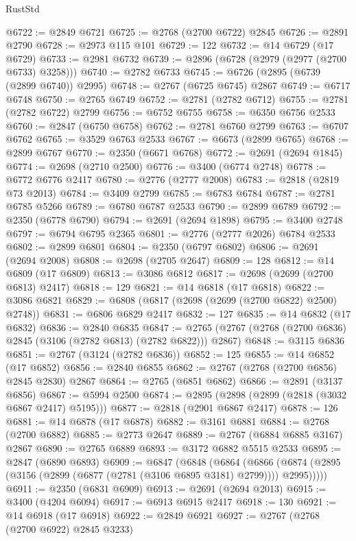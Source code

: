 \begin{lexlean}{RustStd}
\begin{coremodule}
@6722 := @2849 @6721
@6725 := @2768 (@2700 @6722) @2845
@6726 := @2891 @2790
@6728 := @2973 @115 @101
@6729 := 122
@6732 := @14 @6729 (@17 @6729)
@6733 := @2981 @6732
@6739 := @2896 (@6728 (@2979 (@2977 (@2700 @6733) @3258)))
@6740 := @2782 @6733
@6745 := @6726 (@2895 (@6739 (@2899 @6740)) @2995)
@6748 := @2767 (@6725 @6745) @2867
@6749 := @6717 @6748
@6750 := @2765 @6749
@6752 := @2781 (@2782 @6712)
@6755 := @2781 (@2782 @6722) @2799
@6756 := @6752 @6755
@6758 := @6350 @6756 @2533
@6760 := @2847 (@6750 @6758)
@6762 := @2781 @6760 @2799
@6763 := @6707 @6762
@6765 := @3529 @6763 @2533
@6767 := @6673 (@2899 @6765)
@6768 := @2899 @6767
@6770 := @2350 (@6671 @6768)
@6772 := @2691 (@2694 @1845)
@6774 := @2698 (@2710 @2500)
@6776 := @3400 (@6774 @2748)
@6778 := @6772 @6776 @2417
@6780 := @2776 (@2777 @2008)
@6783 := @2818 (@2819 @73 @2013)
@6784 := @3409 @2799
@6785 := @6783 @6784
@6787 := @2781 @6785 @5266
@6789 := @6780 @6787 @2533
@6790 := @2899 @6789
@6792 := @2350 (@6778 @6790)
@6794 := @2691 (@2694 @1898)
@6795 := @3400 @2748
@6797 := @6794 @6795 @2365
@6801 := @2776 (@2777 @2026) @6784 @2533
@6802 := @2899 @6801
@6804 := @2350 (@6797 @6802)
@6806 := @2691 (@2694 @2008)
@6808 := @2698 (@2705 @2647)
@6809 := 128
@6812 := @14 @6809 (@17 @6809)
@6813 := @3086 @6812
@6817 := @2698 (@2699 (@2700 @6813) @2417)
@6818 := 129
@6821 := @14 @6818 (@17 @6818)
@6822 := @3086 @6821
@6829 := @6808 (@6817 (@2698 (@2699 (@2700 @6822) @2500) @2748))
@6831 := @6806 @6829 @2417
@6832 := 127
@6835 := @14 @6832 (@17 @6832)
@6836 := @2840 @6835
@6847 := @2765 (@2767 (@2768 (@2700 @6836) @2845 (@3106 (@2782 @6813) (@2782 @6822))) @2867)
@6848 := @3115 @6836
@6851 := @2767 (@3124 (@2782 @6836))
@6852 := 125
@6855 := @14 @6852 (@17 @6852)
@6856 := @2840 @6855
@6862 := @2767 (@2768 (@2700 @6856) @2845 @2830) @2867
@6864 := @2765 (@6851 @6862)
@6866 := @2891 (@3137 @6856)
@6867 := @5994 @2500
@6874 := @2895 (@2898 (@2899 (@2818 (@3032 @6867 @2417) @5195)))
@6877 := @2818 (@2901 @6867 @2417)
@6878 := 126
@6881 := @14 @6878 (@17 @6878)
@6882 := @3161 @6881
@6884 := @2768 (@2700 @6882)
@6885 := @2773 @2647
@6889 := @2767 (@6884 @6885 @3167) @2867
@6890 := @2765 @6889
@6893 := @3172 @6882 @5515 @2533
@6895 := @2847 (@6890 @6893)
@6909 := @6847
    (@6848
      (@6864
        (@6866 (@6874 (@2895 (@3156 (@2899 (@6877 (@2781 (@3106 @6895 @3181) @2799)))) @2995)))))
@6911 := @2350 (@6831 @6909)
@6913 := @2691 (@2694 @2013)
@6915 := @3400 (@4204 @6094)
@6917 := @6913 @6915 @2417
@6918 := 130
@6921 := @14 @6918 (@17 @6918)
@6922 := @2849 @6921
@6927 := @2767 (@2768 (@2700 @6922) @2845 @3233)

\end{coremodule}
\end{lexlean}
